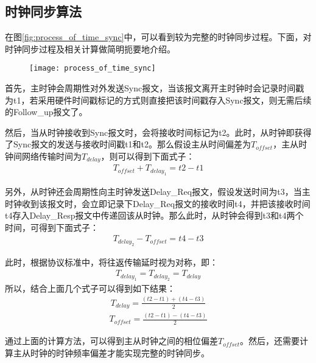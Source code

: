 \subsection{时钟同步算法}
\label{sec:1588_theory_sync}
在图\ref{fig:process_of_time_sync}中，可以看到较为完整的时钟同步过程。下面，对时钟同步过程及相关计算做简明扼要地介绍。

\begin{figure}[!hbp]
  \centering
  \begin{minipage}[b]{0.6\textwidth}
    \captionstyle{\centering}
    \centering
    \texttt{[image: process\_of\_time\_sync]}
  \end{minipage}     
\end{figure}

首先，主时钟会周期性对外发送Sync报文，当该报文离开主时钟时会记录时间戳为t1，若采用硬件时间戳标记的方式则直接把该时间戳存入Sync报文，则无需后续的Follow\_up报文了。

然后，当从时钟接收到Sync报文时，会将接收时间标记为t2。此时，从时钟即获得了Sync报文的发送与接收时间戳t1和t2。那么假设主从时间偏差为$T_{offset}$，主从时钟间网络传输时间为$T_{delay}$，则可以得到下面式子：
\begin{align}
	T_{offset} + T_{delay_1} = t2 - t1
\end{align}

另外，从时钟还会周期性向主时钟发送Delay\_Req报文，假设发送时间为t3，当主时钟收到该报文时，会立即记录下Delay\_Req报文的接收时间t4，并把该接收时间t4存入Delay\_Resp报文中传递回该从时钟。那么此时，从时钟会得到t3和t4两个时间，可得到下面式子：
\begin{align}
	T_{delay_2} - T_{offset} = t4 - t3
\end{align}

此时，根据协议标准中，将往返传输延时视为对称，即：
\begin{align}
	T_{delay_1} = T_{delay_2} = T_{delay}
\end{align}
所以，结合上面几个式子可以得到如下结果：
\begin{align}
	T_{delay} = \frac{(t2 - t1) + (t4 - t3)}{2}
\end{align}
\begin{align}
	T_{offset} = \frac{(t2 - t1) - (t4 - t3)}{2}
\end{align}

通过上面的计算方法，可以得到主从时钟之间的相位偏差$T_{offset}$。然后，还需要计算主从时钟的时钟频率偏差才能实现完整的时钟同步。

